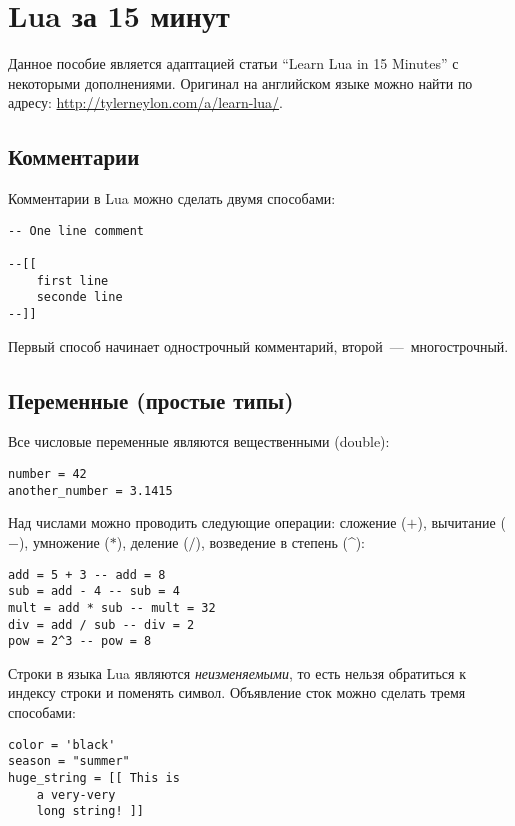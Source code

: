 \section{Lua за 15 минут}

\lstset{style=Lua}

Данное пособие является адаптацией статьи ``Learn Lua in 15 Minutes'' с некоторыми дополнениями. 
Оригинал на английском языке можно найти по адресу: \url{http://tylerneylon.com/a/learn-lua/}.

\subsection{Комментарии}

Комментарии в Lua можно сделать двумя способами:

\begin{lstlisting}
-- One line comment
	
--[[
    first line
    seconde line
--]]
\end{lstlisting}

Первый способ начинает однострочный комментарий, второй~---~многострочный.

\subsection{Переменные (простые типы)}

Все числовые переменные являются вещественными (double):

\begin{lstlisting}
number = 42
another_number = 3.1415
\end{lstlisting}

Над числами можно проводить следующие операции: сложение ($+$), вычитание ($-$), умножение ($*$), деление ($/$), возведение в  степень (\^{}):

\begin{lstlisting}
add = 5 + 3 -- add = 8
sub = add - 4 -- sub = 4
mult = add * sub -- mult = 32
div = add / sub -- div = 2
pow = 2^3 -- pow = 8
\end{lstlisting}

Строки в языка Lua являются \emph{неизменяемыми}, то есть нельзя обратиться к индексу строки и поменять символ.
Объявление сток можно сделать тремя способами:

\begin{lstlisting}
color = 'black'
season = "summer"
huge_string = [[ This is
	a very-very
	long string! ]]
\end{lstlisting}

